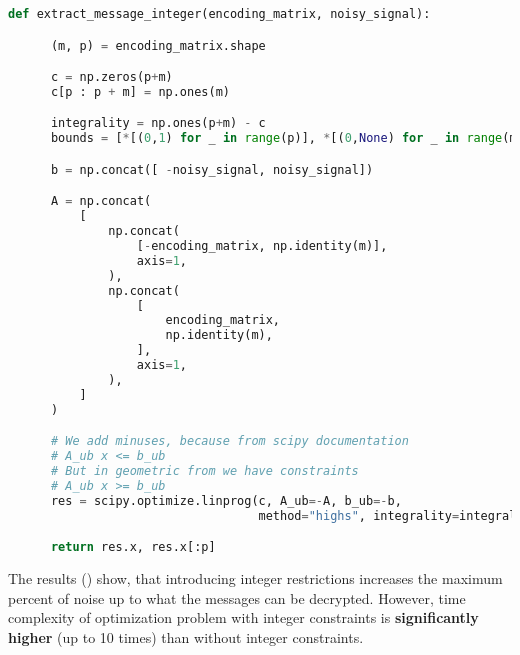 \documentclass{article}
\begin{document}
\begin{minipage}{\linewidth}
  \begin{lstlisting}[language=Python, caption={Message decryption based on solution of integer LOP in geometric form. The output is tuple of solution of the problem, and decrypted message itself}, label={lst:int}]
  def extract_message_integer(encoding_matrix, noisy_signal):

      (m, p) = encoding_matrix.shape

      c = np.zeros(p+m)
      c[p : p + m] = np.ones(m)

      integrality = np.ones(p+m) - c
      bounds = [*[(0,1) for _ in range(p)], *[(0,None) for _ in range(m)]]

      b = np.concat([ -noisy_signal, noisy_signal])

      A = np.concat(
          [
              np.concat(
                  [-encoding_matrix, np.identity(m)],
                  axis=1,
              ),
              np.concat(
                  [
                      encoding_matrix,
                      np.identity(m),
                  ],
                  axis=1,
              ),
          ]
      )

      # We add minuses, because from scipy documentation
      # A_ub x <= b_ub
      # But in geometric from we have constraints
      # A_ub x >= b_ub
      res = scipy.optimize.linprog(c, A_ub=-A, b_ub=-b,
                                   method="highs", integrality=integrality, bounds=bounds)

      return res.x, res.x[:p]
\end{lstlisting}
\end{minipage}


The results () show, that introducing integer restrictions increases the maximum percent of noise up to what the messages can be decrypted. However, time complexity of optimization problem with integer constraints is \textbf{significantly higher} (up to 10 times) than without integer constraints.
\end{document}
